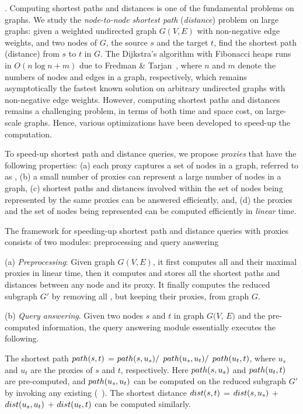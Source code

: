. Computing shortest paths and distances is one of the fundamental problems on graphs. We study the {\em node-to-node shortest path} ({\em distance}) problem on large graphs: given a weighted undirected graph $G(V, E)$ with non-negative edge weights, and two nodes of $G$, the source $s$ and the target $t$, find the shortest path (distance) from $s$ to $t$ in $G$. The Dijkstra's algorithm with Fibonacci heaps runs in $O(n\log n + m)$ due to Fredman \& Tarjan~\cite{CormenLRS01}, where $n$ and $m$ denote the numbers of nodes and edges in a graph, respectively, which remains asymptotically the fastest known solution on arbitrary undirected graphs with non-negative edge weights.
However, computing shortest  paths and distances remains a challenging problem, in terms of both time and space cost, on large-scale graphs. Hence, various optimizations have been developed to speed-up the computation.

To speed-up shortest  path and distance queries, we propose {\em proxies} that have the following properties:
%
(a) each proxy captures a set of nodes in a graph, referred to as \dra, 
%
(b) a small number of proxies can represent a large number of nodes in a graph,
%
(c) shortest paths and distances involved within the set of nodes being represented by the same proxies can be answered efficiently, and,
%
(d) the proxies and the set of nodes being represented can be computed efficiently in {\em linear} time.



The framework for speeding-up shortest path and distance queries with proxies consists of two modules: preprocessing and query answering


\ni(a) {\em Preprocessing}: Given graph $G(V, E)$, it first computes all \dras and their maximal proxies in linear time, then it computes and stores all the shortest paths and distances between any node and its proxy. It finally computes the reduced subgraph $G'$ by removing all \dras, but keeping their proxies, from graph $G$.


\ni(b) {\em Query answering}. Given two nodes $s$ and $t$ in graph $G(V$, $E)$  and the pre-computed information, the query answering module essentially executes the following.

The shortest path $\path(s, t)$ = $\path(s, u_s)/$ $\path(u_s, u_t)/$ $\path(u_t, t)$, where $u_s$ and $u_t$ are the proxies of $s$ and $t$, respectively.
Here  $\path(s, u_s)$ and $\path(u_t, t)$ are pre-computed, and $\path(u_s, u_t)$ can be computed on the reduced subgraph $G'$ by invoking any existing 
(\eg \ah~\cite{zhu2013shortest}). 
%
The shortest distance $\dist(s, t)$ = $\dist(s, u_s)$ + $\dist(u_s, u_t)$ + $\dist(u_t, t)$ can be computed similarly.

